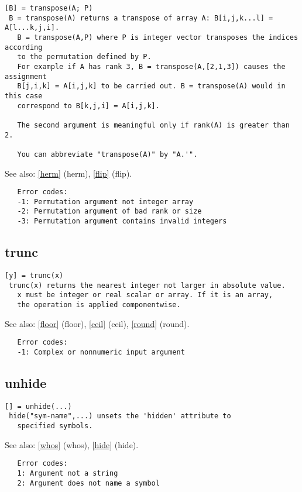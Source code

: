 \documentclass[a4paper]{article}
\begin{document}
\begin{tscreen}
\begin{verbatim}
[B] = transpose(A; P)
 B = transpose(A) returns a transpose of array A: B[i,j,k...l] = A[l...k,j,i].
   B = transpose(A,P) where P is integer vector transposes the indices according
   to the permutation defined by P.
   For example if A has rank 3, B = transpose(A,[2,1,3]) causes the assignment
   B[j,i,k] = A[i,j,k] to be carried out. B = transpose(A) would in this case
   correspond to B[k,j,i] = A[i,j,k].

   The second argument is meaningful only if rank(A) is greater than 2.
   
   You can abbreviate "transpose(A)" by "A.'".
\end{verbatim}

See also: \ref{herm} {(herm)}, \ref{flip} {(flip)}.
\begin{verbatim}
   Error codes:
   -1: Permutation argument not integer array
   -2: Permutation argument of bad rank or size
   -3: Permutation argument contains invalid integers 
\end{verbatim}
\end{tscreen}



\subsection{trunc\label{trunc}}

\begin{tscreen}
\begin{verbatim}
[y] = trunc(x)
 trunc(x) returns the nearest integer not larger in absolute value.
   x must be integer or real scalar or array. If it is an array,
   the operation is applied componentwise.
\end{verbatim}

See also: \ref{floor} {(floor)}, \ref{ceil} {(ceil)}, \ref{round} {(round)}.
\begin{verbatim}
   Error codes:
   -1: Complex or nonnumeric input argument 
\end{verbatim}
\end{tscreen}



\subsection{unhide\label{unhide}}

\begin{tscreen}
\begin{verbatim}
[] = unhide(...)
 hide("sym-name",...) unsets the 'hidden' attribute to
   specified symbols.
\end{verbatim}

See also: \ref{whos} {(whos)}, \ref{hide} {(hide)}.
\begin{verbatim}
   Error codes:
   1: Argument not a string
   2: Argument does not name a symbol
   
\end{verbatim}
\end{tscreen}
\end{document}

